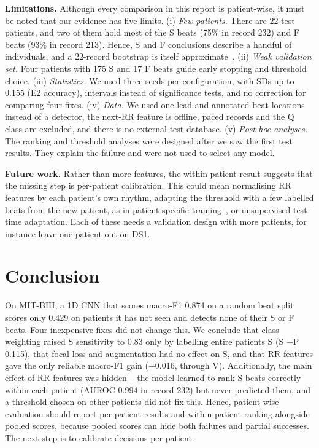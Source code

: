 \documentclass[10pt,a4paper]{article}
\begin{document}
\textbf{Limitations.} Although every comparison in this report is patient-wise, it must be noted that our evidence has five limits. (i) \emph{Few patients.} There are 22 test patients, and two of them hold most of the S beats (75\% in record 232) and F beats (93\% in record 213). Hence, S and F conclusions describe a handful of individuals, and a 22-record bootstrap is itself approximate~\cite{Efron1993}. (ii) \emph{Weak validation set.} Four patients with 175 S and 17 F beats guide early stopping and threshold choice. (iii) \emph{Statistics.} We used three seeds per configuration, with SDs up to 0.155 (E2 accuracy), intervals instead of significance tests, and no correction for comparing four fixes. (iv) \emph{Data.} We used one lead and annotated beat locations instead of a detector, the next-RR feature is offline, paced records and the Q class are excluded, and there is no external test database. (v) \emph{Post-hoc analyses.} The ranking and threshold analyses were designed after we saw the first test results. They explain the failure and were not used to select any model.

\textbf{Future work.} Rather than more features, the within-patient result suggests that the missing step is per-patient calibration. This could mean normalising RR features by each patient's own rhythm, adapting the threshold with a few labelled beats from the new patient, as in patient-specific training~\cite{Kiranyaz2016}, or unsupervised test-time adaptation. Each of these needs a validation design with more patients, for instance leave-one-patient-out on DS1.

\section{Conclusion}

On MIT-BIH, a 1D CNN that scores macro-F1 0.874 on a random beat split scores only 0.429 on patients it has not seen and detects none of their S or F beats. Four inexpensive fixes did not change this. We conclude that class weighting raised S sensitivity to 0.83 only by labelling entire patients S (S +P 0.115), that focal loss and augmentation had no effect on S, and that RR features gave the only reliable macro-F1 gain (+0.016, through V). Additionally, the main effect of RR features was hidden -- the model learned to rank S beats correctly within each patient (AUROC 0.994 in record 232) but never predicted them, and a threshold chosen on other patients did not fix this. Hence, patient-wise evaluation should report per-patient results and within-patient ranking alongside pooled scores, because pooled scores can hide both failures and partial successes. The next step is to calibrate decisions per patient.
\end{document}
